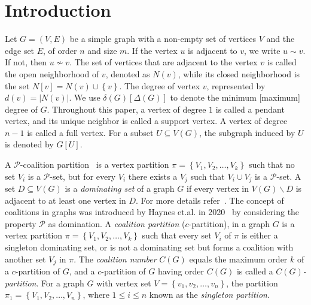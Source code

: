 \documentclass[12pt]{article}
\begin{document}
  \section{Introduction}
    Let $G=(V, E)$ be a simple graph with a non-empty set of vertices $V$ and the edge set $E$, of order $n$ and size $m$. If the vertex $u$ is adjacent to $v$, we write $u\sim v$. If not, then $u\not\sim v$. The set of vertices that are adjacent to the vertex $v$ is called the open neighborhood of $v$, denoted as $N(v)$, while its closed neighborhood is the set $N[v]=N(v)\cup \left\{v\right\}$. The degree of vertex $v$, represented by $d(v)=|N(v)|$. We use $\delta(G)[\Delta(G)]$ to denote the minimum [maximum] degree of $G$. Throughout this paper, a vertex of degree $1$ is called a pendant vertex, and its unique neighbor is called a support vertex. A vertex of degree $n-1$ is called a full vertex. For a subset $U\subseteq V(G)$, the subgraph induced by $U$ is denoted by $G[U]$.\par
    A $\mathcal{P}$-coalition partition~\cite{haynes2023coalition} is a vertex partition $\pi = \left\{V_1, V_2, \dots, V_k\right\}$ such that no set $V_i$ is a $\mathcal{P}$-set, but for every $V_i$ there exists a $V_j$ such that $V_i \cup V_j$ is a $\mathcal{P}$-set.
     A set $D \subseteq V(G)$ is a \textit{dominating set} of a graph $G$ if every vertex in $V(G) \backslash D$ is adjacent to at least one vertex in $D$.  For more details refer~\cite{haynes2013fundamentals,haynes2020topics}.
    The concept of coalitions in graphs was introduced by Haynes et.al. in 2020~\cite{haynes2020introduction} by considering the property $\mathcal{P}$ as domination.
     A \textit{coalition partition} ($c$-partition), in a graph $G$ is a vertex partition $\pi=\left\{V_1, V_2,\dots, V_k\right\}$ such that every set $V_i$ of $\pi$ is either a singleton dominating set, or is not a dominating set but forms a coalition with another set $V_j$ in $\pi$.
    The \textit{coalition number} $C(G)$ equals the maximum order $k$ of a $c$-partition of $G$, and a $c$-partition of $G$ having order $C(G)$ is called a \textit{$C(G)$-partition}. For a graph $G$ with vertex set $V=\left\{v_1,v_2,\dots,v_n\right\}$, the partition $\pi_1=\left\{V_1,V_2,\dots,V_n\right\}$, where $1\le i\le n$ known as the \textit{singleton partition}.\par
\end{document}
